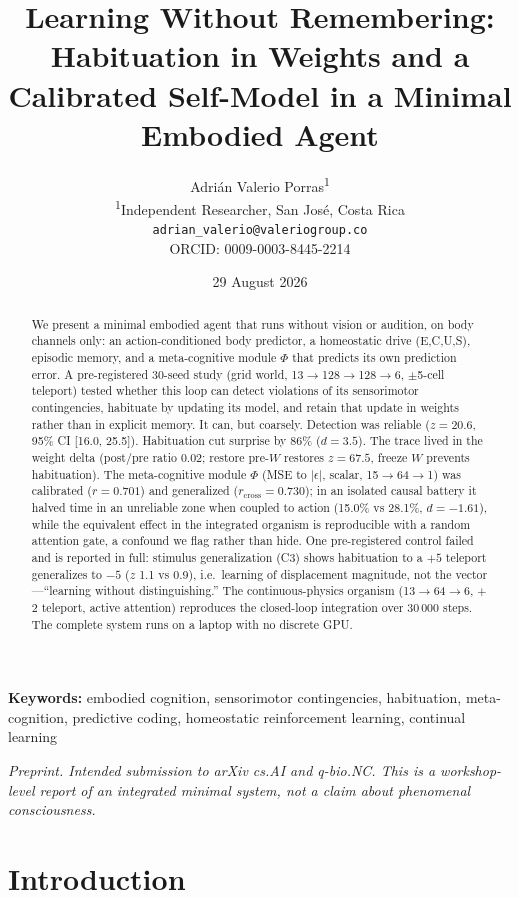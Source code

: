 \documentclass[11pt,a4paper]{article}
\title{Learning Without Remembering: Habituation in Weights and a Calibrated Self-Model in a Minimal Embodied Agent}
\author{Adri\'an Valerio Porras\textsuperscript{1} \\ \small \textsuperscript{1}Independent Researcher, San Jos\'e, Costa Rica \\ \small \texttt{adrian\_valerio@valeriogroup.co} \\ \small ORCID: 0009-0003-8445-2214 }
\date{29 August 2026}
\begin{document}
\maketitle

\begin{abstract}
We present a minimal embodied agent that runs without vision or audition, on body channels only: an action-conditioned body predictor, a homeostatic drive (E,C,U,S), episodic memory, and a meta-cognitive module $\Phi$ that predicts its own prediction error. A pre-registered 30-seed study (grid world, 13$\rightarrow$128$\rightarrow$128$\rightarrow$6, $\pm$5-cell teleport) tested whether this loop can detect violations of its sensorimotor contingencies, habituate by updating its model, and retain that update in weights rather than in explicit memory. It can, but coarsely. Detection was reliable ($z=20.6$, 95\% CI [16.0, 25.5]). Habituation cut surprise by 86\% ($d=3.5$). The trace lived in the weight delta (post/pre ratio 0.02; restore pre-$W$ restores $z=67.5$, freeze $W$ prevents habituation). The meta-cognitive module $\Phi$ (MSE to $|\epsilon|$, scalar, 15$\rightarrow$64$\rightarrow$1) was calibrated ($r=0.701$) and generalized ($r_{\mathrm{cross}}=0.730$); in an isolated causal battery it halved time in an unreliable zone when coupled to action (15.0\% vs 28.1\%, $d=-1.61$), while the equivalent effect in the integrated organism is reproducible with a random attention gate, a confound we flag rather than hide. One pre-registered control failed and is reported in full: stimulus generalization (C3) shows habituation to a $+5$ teleport generalizes to $-5$ ($z$ 1.1 vs 0.9), i.e.\ learning of displacement magnitude, not the vector---``learning without distinguishing.'' The continuous-physics organism (13$\rightarrow$64$\rightarrow$6, $+$2 teleport, active attention) reproduces the closed-loop integration over 30\,000 steps. The complete system runs on a laptop with no discrete GPU.
\end{abstract}

\noindent\textbf{Keywords:} embodied cognition, sensorimotor contingencies, habituation, meta-cognition, predictive coding, homeostatic reinforcement learning, continual learning

\noindent\textit{Preprint. Intended submission to arXiv cs.AI and q-bio.NC. This is a workshop-level report of an integrated minimal system, not a claim about phenomenal consciousness.}


\section{Introduction}
\end{document}
